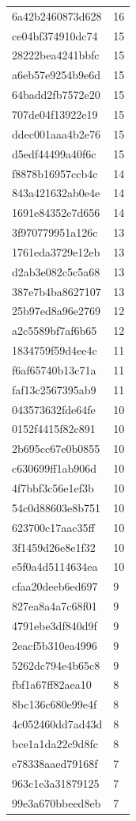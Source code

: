 \begin{tabular}{ll}
6a42b2460873d628 & 16 \\
ce04bf374910dc74 & 15 \\
28222bea4241bbfc & 15 \\
a6eb57e9254b9e6d & 15 \\
64badd2fb7572e20 & 15 \\
707de04f13922e19 & 15 \\
ddec001aaa4b2e76 & 15 \\
d5edf44499a40f6c & 15 \\
f8878b16957ccb4c & 14 \\
843a421632ab0e4e & 14 \\
1691e84352e7d656 & 14 \\
3f970779951a126c & 13 \\
1761eda3729e12eb & 13 \\
d2ab3e082c5c5a68 & 13 \\
387e7b4ba8627107 & 13 \\
25b97ed8a96e2769 & 12 \\
a2c5589bf7af6b65 & 12 \\
1834759f59d4ee4c & 11 \\
f6af65740b13c71a & 11 \\
faf13c2567395ab9 & 11 \\
043573632fde64fe & 10 \\
0152f4415f82c891 & 10 \\
2b695cc67e0b0855 & 10 \\
c630699ff1ab906d & 10 \\
4f7bbf3c56e1ef3b & 10 \\
54c0d88603e8b751 & 10 \\
623700c17aac35ff & 10 \\
3f1459d26e8e1f32 & 10 \\
e5f0a4d5114634ea & 10 \\
cfaa20deeb6ed697 & 9 \\
827ea8a4a7c68f01 & 9 \\
4791ebe3df840d9f & 9 \\
2eacf5b310ea4996 & 9 \\
5262dc794e4b65c8 & 9 \\
fbf1a67ff82aea10 & 8 \\
8bc136c680e99e4f & 8 \\
4c052460dd7ad43d & 8 \\
bce1a1da22c9d8fc & 8 \\
e78338aaed79168f & 7 \\
963c1e3a31879125 & 7 \\
99e3a670bbeed8eb & 7 \\

\end{tabular}
